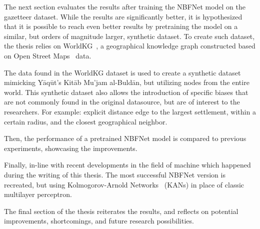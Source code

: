 The next section evaluates the results after training the NBFNet model on the gazetteer dataset.
While the results are significantly better, it is hypothesized that it is possible to reach even better results
by pretraining the model on a similar, but orders of magnitude larger, synthetic dataset.
To create such dataset, the thesis relies on WorldKG~\cite{WorldKG}, a geographical knowledge graph constructed based on Open Street
Maps~\cite{OpenStreetMap} data.

The data found in the WorldKG dataset is used to create a synthetic dataset mimicking Yāqūt's Kitāb Mu'jam al-Buldān,
but utilizing nodes from the entire world.
This synthetic dataset also allows the introduction of specific biases that are not commonly found in the original datasource,
but are of interest to the researchers.
For example: explicit distance edge to the largest settlement, within a certain radius, and the closest geographical neighbor.

Then, the performance of a pretrained NBFNet model is compared to previous experiments, showcasing the improvements.

Finally, in-line with recent developments in the field of machine which happened during the writing of this thesis.
The most successful NBFNet version is recreated, but using Kolmogorov-Arnold Networks~\cite{KAN} (KANs) in place of classic multilayer
perceptron.

The final section of the thesis reiterates the results, and reflects on potential improvements, shortcomings, and future
research possibilities.





